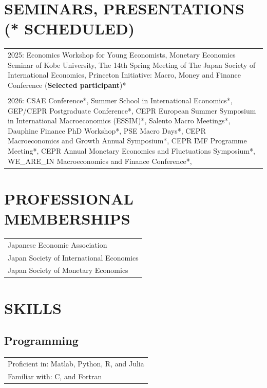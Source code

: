 \documentclass[11pt]{article}
\begin{document}

\section*{SEMINARS, PRESENTATIONS (* SCHEDULED)}
\begin{tabularx}{\linewidth}{X}
2025: Economics Workshop for Young Economists, Monetary Economics Seminar of Kobe University, The 14th Spring Meeting of The Japan Society of International Economics, Princeton Initiative: Macro, Money and Finance Conference (\textbf{Selected participant})*  \\
\\
\if0
2026: CSAE Conference*, Summer School in International Economics*, GEP/CEPR Postgraduate Conference*, CEPR European Summer Symposium in International Macroeconomics (ESSIM)*, Salento Macro Meetings*, Dauphine Finance PhD Workshop*, PSE Macro Days*, CEPR Macroeconomics and Growth Annual Symposium*, CEPR IMF Programme Meeting*, CEPR Annual Monetary Economics and Fluctuations Symposium*, WE\_ARE\_IN Macroeconomics and Finance Conference*, 
\fi
\end{tabularx}

\section*{PROFESSIONAL MEMBERSHIPS}
\begin{tabularx}{\linewidth}{X}
Japanese Economic Association\\
Japan Society of International Economics \\
Japan Society of Monetary Economics
\end{tabularx}

\section*{SKILLS}
\subsection*{Programming}
\begin{tabularx}{\linewidth}{X}
Proficient in: Matlab, Python, R, and Julia\\
Familiar with: C, and Fortran
\end{tabularx}
\end{document}
